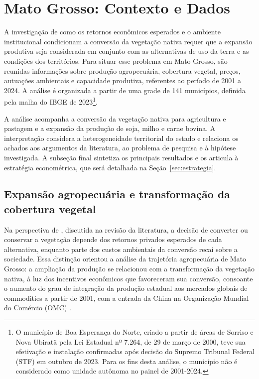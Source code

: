 \section{Mato Grosso: Contexto e Dados}
\label{descritiva-dados}

\begingroup


A investigação de como os retornos econômicos esperados e o ambiente institucional condicionam a conversão da vegetação nativa requer que a expansão produtiva seja considerada em conjunto com as alternativas de uso da terra e as condições dos territórios. Para situar esse problema em Mato Grosso, são reunidas informações sobre produção agropecuária, cobertura vegetal, preços, autuações ambientais e capacidade produtiva, referentes ao período de 2001 a 2024. A análise é organizada a partir de uma grade de 141 municípios, definida pela malha do IBGE de 2023\footnote{O município de Boa Esperança do Norte, criado a partir de áreas de Sorriso e Nova Ubiratã pela Lei Estadual nº 7.264, de 29 de março de 2000, teve sua efetivação e instalação confirmadas após decisão do Supremo Tribunal Federal (STF) em outubro de 2023. Para os fins desta análise, o município não é considerado como unidade autônoma no painel de 2001-2024.}.

A análise acompanha a conversão da vegetação nativa para agricultura e pastagem e a expansão da produção de soja, milho e carne bovina. A interpretação considera a heterogeneidade territorial do estado e relaciona os achados aos argumentos da literatura, ao problema de pesquisa e à hipótese investigada. A subseção final sintetiza os principais resultados e os articula à estratégia econométrica, que será detalhada na Seção~\ref{sec:estrategia}.

\subsection{Expansão agropecuária e transformação da cobertura vegetal}
\label{descritiva-retornos}

Na perspectiva de , discutida na revisão da literatura, a decisão de converter ou conservar a vegetação depende dos retornos privados esperados de cada alternativa, enquanto parte dos custos ambientais da conversão recai sobre a sociedade. Essa distinção orientou a análise da trajetória agropecuária de Mato Grosso: a ampliação da produção se relacionou com a transformação da vegetação nativa, à luz dos incentivos econômicos que favoreceram sua conversão, consoante o aumento do grau de integração da produção estadual aos mercados globais de commodities a partir de 2001, com a entrada da China na Organização Mundial do Comércio (OMC) \cite{fearnside2016china}.

